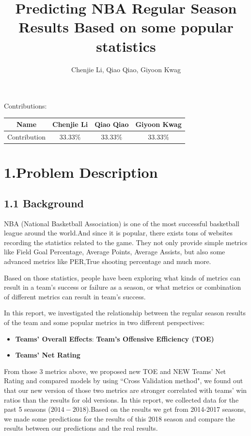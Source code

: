 \documentclass[11pt]{article}
\begin{document}
\title{Predicting NBA Regular Season Results Based on some popular statistics}
\author{Chenjie Li, Qiao Qiao, Giyoon Kwag}
\maketitle

\vspace*{3\baselineskip}
\begin{center}
Contributions:\\
\end{center}
\begin{center}
\begin{tabular}{|c|c|c|c|}
\hline
Name & Chenjie Li& Qiao Qiao & Giyoon Kwag\\
\hline
Contribution &  $33.33\%$ & $33.33\%$ & $33.33\%$ \\
\hline
\end{tabular}
\end{center}
\newpage

\section*{1.Problem Description}
\subsection*{1.1 Background}
\hspace{1.5em} NBA (National Basketball Association) is one of the most successful basketball league around the world.And since it is popular, there exists tons of websites recording the statistics related to the game. They not only provide simple metrics like Field Goal Percentage,  Average Points, Average Assists, but also some advanced metrics like PER,True shooting percentage and much more.

Based on those statistics, people have been exploring what kinds of metrics can result in a team's success or failure as a season, or what metrics or combination of different metrics can result in team's success.

In this report, we investigated the relationship between the regular season results of the team and some popular metrics in two different perspectives: 
\begin{itemize}
\item \textbf{Teams' Overall Effects}: \textbf{Team's Offensive Efficiency (TOE)}
\item \textbf{Teams' Net Rating}
\end{itemize}
From those 3 metrics above, we proposed new TOE and NEW Teams' Net Rating and compared models by using ``Cross Validation method", we found out that our new version of those two metrics are stronger correlated with teams' win ratios than the results for old versions.
In this report, we collected data for the past 5 seasons ($2014-2018$).Based on the results we get from 2014-2017 seasons, we made some predictions for the results of this 2018 season and compare the results between our predictions and the real results.
\end{document}
